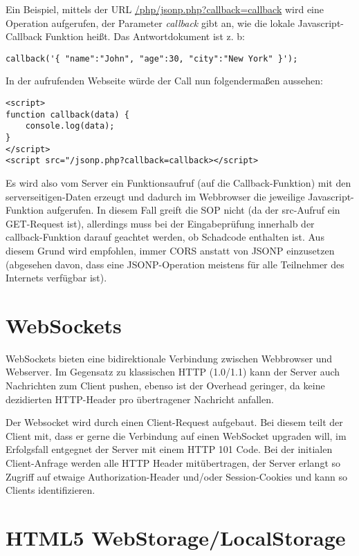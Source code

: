 Ein Beispiel, mittels der URL \url{/php/jsonp.php?callback=callback} wird eine Operation aufgerufen, der Parameter \textit{callback} gibt an, wie die lokale Javascript-Callback Funktion heißt. Das Antwortdokument ist z. b:

\begin{verbatim}
callback('{ "name":"John", "age":30, "city":"New York" }');
\end{verbatim}

In der aufrufenden Webseite würde der Call nun folgendermaßen aussehen:

\begin{verbatim}
<script>
function callback(data) {
	console.log(data);
}
</script>
<script src="/jsonp.php?callback=callback></script>
\end{verbatim}

Es wird also vom Server ein Funktionsaufruf (auf die Callback-Funktion) mit den serverseitigen-Daten erzeugt und dadurch im Webbrowser die jeweilige Javascript-Funktion aufgerufen. In diesem Fall greift die SOP nicht (da der src-Aufruf ein GET-Request ist), allerdings muss bei der Eingabeprüfung innerhalb der callback-Funktion darauf geachtet werden, ob Schadcode enthalten ist. Aus diesem Grund wird empfohlen, immer CORS anstatt von JSONP einzusetzen (abgesehen davon, dass eine JSONP-Operation meistens für alle Teilnehmer des Internets verfügbar ist).

\section{WebSockets} 

WebSockets bieten eine bidirektionale Verbindung zwischen Webbrowser und Webserver. Im Gegensatz zu klassischen HTTP (1.0/1.1) kann der Server auch Nachrichten zum Client pushen, ebenso ist der Overhead geringer, da keine dezidierten HTTP-Header pro übertragener Nachricht anfallen.

Der Websocket wird durch einen Client-Request aufgebaut. Bei diesem teilt der Client mit, dass er gerne die Verbindung auf einen WebSocket upgraden will, im Erfolgsfall entgegnet der Server mit einem HTTP 101 Code. Bei der initialen Client-Anfrage werden alle HTTP Header mitübertragen, der Server erlangt so Zugriff auf etwaige Authorization-Header und/oder Session-Cookies und kann so Clients identifizieren.

\section{HTML5 WebStorage/LocalStorage}

